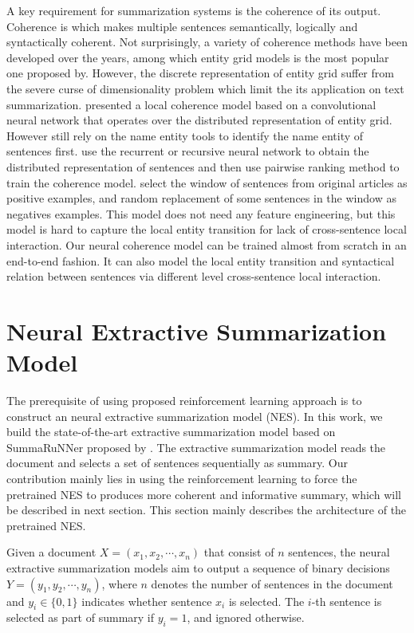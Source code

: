 \documentclass[letterpaper]{article} %
\begin{document}
	
	A key requirement for summarization systems is the coherence of its output. Coherence is which makes multiple sentences semantically, logically and syntactically coherent\cite{Yao2017RecentAI}. Not surprisingly, a variety of coherence methods have been developed over the years\cite{Yao2017RecentAI}, among which entity grid models is the most popular one proposed by\cite{entitygrid}. However, the discrete representation of entity grid suffer from the severe curse of dimensionality problem which limit the its application on text summarization. \cite{nlcm} presented a local coherence model based on a convolutional neural network that operates over the distributed representation of entity grid. However \cite{nlcm} still rely on the name entity tools to identify the name entity of sentences first. \cite{jiweili2014}  use the recurrent or recursive neural network to obtain the distributed representation of sentences and then use pairwise ranking method to train the coherence model. \cite{jiweili2014} select the window of sentences from original articles as positive examples, and random replacement of some sentences in the window as negatives examples. This model does not need any feature engineering, but this model is hard to capture the local entity transition for lack of cross-sentence local interaction. Our neural coherence model can be trained almost from scratch in an end-to-end fashion. It can also model the local entity transition and syntactical relation between sentences via different level cross-sentence local interaction. 

	\section{Neural Extractive Summarization Model}
	
	The prerequisite of using proposed reinforcement learning approach is to construct an neural extractive summarization model (NES). In this work, we build the state-of-the-art extractive summarization model based on SummaRuNNer proposed by \cite{SummaRuNNer}. The extractive summarization model reads the document and selects a set of sentences sequentially as summary. Our contribution mainly lies in using the reinforcement learning to force the pretrained NES to produces more coherent and informative summary, which will be described in next section. This section mainly describes the architecture of the pretrained NES.  
	
	Given a document $X=(x_1, x_2, \cdots, x_n)$ that consist of $n$ sentences, the neural extractive summarization models aim to output a sequence of binary decisions $Y=(y_1, y_2, \cdots, y_n)$, where $n$ denotes the number of sentences in the document and $y_i \in \{0,1\}$ indicates whether sentence $x_i$ is selected. The $i$-th sentence is selected as part of summary if $y_i=1$, and ignored otherwise.
	
\end{document}
